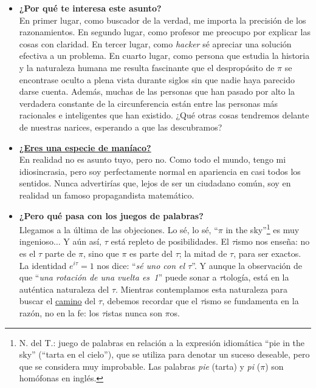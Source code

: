 \begin{itemize}
  \item \textbf{¿Por qué te interesa este asunto?} \\ En primer lugar, como buscador de la verdad, me importa la precisión de los razonamientos. En segundo lugar, como profesor me preocupo por explicar las cosas con claridad. En tercer lugar, como \emph{hacker} sé apreciar una solución efectiva a un problema. En cuarto lugar, como persona que estudia la historia y la naturaleza humana me resulta fascinante que el despropósito de $\pi$ se encontrase oculto a plena vista durante siglos sin que nadie haya parecido darse cuenta. Además, muchas de las personas que han pasado por alto la verdadera constante de la circunferencia están entre las personas más racionales e inteligentes que han existido. ¿Qué otras cosas tendremos delante de nuestras narices, esperando a que las descubramos?

  \item \href{https://youtube.com/clip/UgkxgkaP4J9lCZ8Yjd7Fe9iLGDHYfd9anfR1}{\textbf{¿Eres una especie de maníaco?}} \\ En realidad no es asunto tuyo, pero no. Como todo el mundo, tengo mi idiosincrasia, pero soy perfectamente normal en apariencia en casi todos los sentidos. Nunca advertirías que, lejos de ser un ciudadano común, soy en realidad un famoso propagandista matemático.


  \item \textbf{¿Pero qué pasa con los juegos de palabras?} \\ Llegamos a la última de las objeciones. Lo sé, lo sé, ``$\pi$ in the sky''\footnote{N. del T.: juego de palabras en relación a la expresión idiomática ``pie in the sky'' (``tarta en el cielo''), que se utiliza para denotar un suceso deseable, pero que se considera muy improbable. Las palabras \emph{pie} (tarta) y \emph{pi} ($\pi$) son homófonas en inglés.} es muy ingenioso$\ldots$ Y aún así, $\tau$ está repleto de posibilidades. El $\tau$ismo nos enseña: no es el $\tau$ parte de $\pi$, sino que $\pi$ es parte del $\tau$; la mitad de $\tau$, para ser exactos. La identidad $e^{i\tau} = 1$ nos dice: ``\emph{sé uno con el $\tau$}''. Y aunque la observación de que ``\emph{una rotación de una vuelta es~1}'' puede sonar a $\tau$tología, está en la auténtica naturaleza del $\tau$. Mientras contemplamos esta naturaleza para buscar el \href{https://es.wikipedia.org/wiki/Tao}{camino} del $\tau$, debemos recordar que el $\tau$ismo se fundamenta en la razón, no en la fe: los $\tau$istas nunca son $\pi$os.


\end{itemize}

